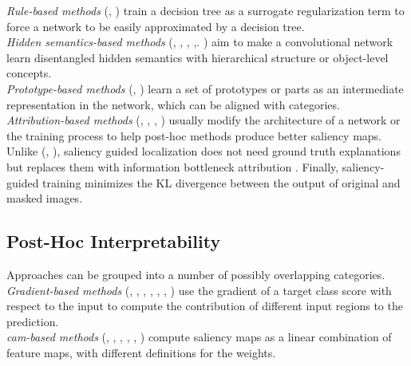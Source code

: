 \noindent \emph{Rule-based methods} (\cite{wu2018beyond}, \cite{wu2020regional}) train a decision tree as a 
surrogate regularization term to force a network to be easily approximated by a decision tree.\\

\noindent \emph{Hidden semantics-based methods} (\cite{bau2017network}, \cite{zhou2018interpreting}, 
\cite{zhang2018interpretable}, \cite{zhou2014object},\cite{bohle2022b}. \cite{bohle2024b}) aim to 
make a convolutional network learn disentangled hidden semantics with hierarchical structure or 
object-level concepts.\\

\noindent \emph{Prototype-based methods} (\cite{li2018deep}, \cite{chen2019looks}) learn a set of prototypes 
or parts as an intermediate representation in the network, which can be aligned with categories.\\

\noindent \emph{Attribution-based methods} (\cite{ismail2021improving}, \cite{Zhou_2022_BMVC}, 
\cite{ross2017right}, \cite{ghaeini2019saliency}) usually modify the architecture of a network or 
the training process to help post-hoc methods produce better saliency maps. Unlike 
(\cite{ross2017right}, \cite{ghaeini2019saliency}), saliency guided localization 
\autocite{Zhou_2022_BMVC} does not need ground truth explanations but replaces them with 
information bottleneck attribution \autocite{schulz2020restricting}. Finally, saliency-guided 
training \autocite{ismail2021improving} minimizes the KL divergence between the output of original 
and masked images. \\



\subsection{Post-Hoc Interpretability}
\label{rel:sub_post}

Approaches can be grouped into a number of possibly overlapping categories. 
\noindent \emph{Gradient-based methods} (\cite{adebayo2018local}, \cite{guidedbackprop}, 
\cite{baehrens2010explain}, \cite{simonyan2013deep}, \cite{smilkov2017smoothgrad}, 
\cite{bach2015pixel}, \cite{sundararajan2017axiomatic}) use the gradient of a target class 
score with respect to the input to compute the contribution of different input regions to the 
prediction. \\

\noindent \emph{\gls{cam}-based methods} (\cite{wang2020score}, \cite{chattopadhay2018grad}, 
\cite{selvaraju2017grad}, \cite{axiombased}, \cite{jiang2021layercam}, \cite{ablationcam}) 
compute saliency maps as a linear combination of feature maps, with different definitions for 
the weights.\\

